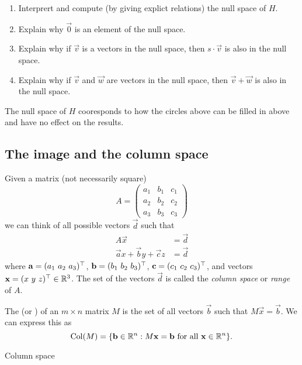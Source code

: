 \documentclass{ximera}
\begin{document}
\begin{example}
\begin{enumerate}
    \item Interprert and compute (by giving explict relations) the null space
          of
          $H$.
    \item Explain why $\vec{0}$ is an element of the null space.
    \item Explain why if $\vec{v}$ is a vectors in the null space, then $s\cdot
            \vec{v}$ is also in the null space.
    \item Explain why if $\vec{v}$ and $\vec{w}$ are vectors in the null space,
          then $\vec{v} + \vec{w}$ is also in the null space.
  \end{enumerate}
  \begin{explanation}
    The null space of $H$ cooresponds to how the circles above can be filled in
    above and have no effect on the results.
  \end{explanation}
\end{example}

\subsection{The image and the column space}

Given a matrix (not necessarily square)
\[
  A = \begin{pmatrix}
    a_1 & b_1 & c_1 \\
    a_2 & b_2 & c_2 \\
    a_3 & b_3 & c_3
  \end{pmatrix}
\]
we can think of all possible vectors $\vec{d}$ such that
\begin{align*}
  A\vec{x}                          & = \vec{d} \\
  \vec{a} x + \vec{b} y + \vec{c} z & = \vec{d}
\end{align*}
where $\mathbf{a} = (a_1~a_2~a_3)^\top$, $\mathbf{b} =
  (b_1~b_2~b_3)^\top$, $\mathbf{c} = (c_1~c_2~c_3)^\top$, and vectors
$\mathbf{x} = (x~y~z)^\top\in\mathbb{R}^3$.
The set of the vectors $\vec{d}$ is called the \textit{column space} or
\textit{range} of $A$.

\begin{definition}
  The  (or ) of an $m \times n$ matrix $M$ is
  the set of all vectors $\vec{b}$ such that $M\vec{x} = \vec{b}$. We can
  express
  this as
  \[
    \operatorname{Col}(M) = \{ \mathbf{b}\in\mathbb{R}^n: M\mathbf{x} = \mathbf{b}\text{~for
      all~}\mathbf{x}\in\mathbb{R}^n\}.
  \]
\end{definition}

\begin{example}
  Column space
\end{example}
\end{document}
